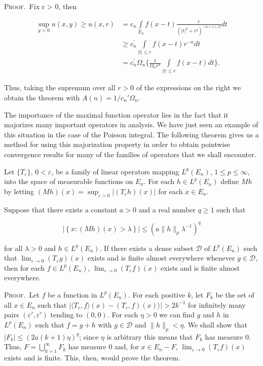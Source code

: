 \textsc{Proof.}\ Fix r > 0, then

\[
\begin{aligned}\sup_{y>0}u(x,y)\geq u(x,r)&=c_{n}\int\limits_{E_{n}}f(x-t)\frac{r}{(|t|^{2}+r^{2})^{(n+1)/2}}dt\\&\geq c_{n}^{\prime}\int\limits_{|t|\leq r}f(x-t)r^{-n}dt\\&=c_{n}^{\prime}\Omega_{n}\Biggl\{\frac{1}{\Omega_{n} r^{n}}\int\limits_{|t|\leq r}f(x-t)dt\Biggr\}.\end{aligned}
\]

Thus, taking the supremum over all $r > 0$ of the expressions on the right we obtain the theorem with $A(n) = 1/c_n' \Omega_n$.

The importance of the maximal function operator lies in the fact that it majorizes many important operators in analysis. We have just seen an example of this situation in the case of the Poisson integral. The following theorem gives us a method for using this majorization property in order to obtain pointwise convergence results for many of the families of operators that we shall encounter.

\begin{theorem}
\label{thm:c2-3-12}
Let $\{T_\varepsilon\}$, $0 < \varepsilon$, be a family of linear operators mapping $L^p(E_n)$, $1 \leq p \leq \infty$, into the space of measurable functions on $E_\pi$. For each $h \in L^p(E_n)$ define $M h$ by letting $(M h)(x) = \sup_{\varepsilon > 0} |(T_\varepsilon h)(x)|$ for each $x \in E_n$.
\end{theorem}

Suppose that there exists a constant $a > 0$ and a real number $q \geq 1$ such that

\begin{equation}\label{eq:c2-3-13}
\left|\left\{x:\left(M h\right)(x)>\lambda\right\}\right|\leq(a\|h\|_{p}\lambda^{-1})^{q}
\end{equation}

for all $\lambda > 0$ and $h \in L^p(E_n)$. If there exists a dense subset $\mathcal{D}$ of $L^p(E_n)$ such that $\lim_{\varepsilon \to 0} (T_\varepsilon g)(x)$ exists and is finite almost everywhere whenever $g \in \mathcal{D}$, then for each $f \in L^p(E_n)$, $\lim_{\varepsilon \to 0} (T_\varepsilon f)(x)$ exists and is finite almost everywhere.

\textsc{Proof.}\ Let $f$ be a function in $L^p(E_n)$. For each positive $k$, let $F_k$ be the set of all $x \in E_n$ such that $|\langle T_{\varepsilon}, f \rangle(x) - (T_{\varepsilon}, f)(x) \rangle| > 2k^{-1}$ for infinitely many pairs $(\varepsilon', \varepsilon')$ tending to $(0, 0)$. For each $\eta > 0$ we can find $g$ and $h$ in $L^p(E_n)$ such that $f = g + h$ with $g \in \mathcal{D}$ and $\|h\|_p < \eta$. We shall show that $|F_k| \leq (2a(k + 1)\eta)^q$; since $\eta$ is arbitrary this means that $F_k$ has measure 0. Thus, $F = \bigcup_{k=1}^{\infty} F_k$ has measure 0 and, for $x \in E_n - F$, $\lim_{\varepsilon \to 0} (T_{\varepsilon} f)(x)$ exists and is finite. This, then, would prove the theorem.

